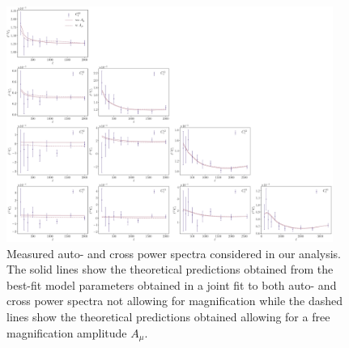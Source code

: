 \documentclass[a4paper,11pt]{article}
\begin{document}
\begin{figure}
\begin{center}
\includegraphics[width=0.95\textwidth]{figures/Cls-data-vs-best-fit_mPk=HOD_fix=alpha-fc-sigmaM_HOD=zevol_fit=pz-shifts+prior=0p2-pz-widths+prior=0p2_fit=auto+cross_cosmo=const_cov=G+NG+SSC-LINBIAS_HOD-param=zfid_clfit=HOD-zevol_no-mag-vs-mag.pdf}
\caption{Measured auto- and cross power spectra considered in our analysis. The solid lines show the theoretical predictions obtained from the best-fit model parameters obtained in a joint fit to both auto- and cross power spectra not allowing for magnification while the dashed lines show the theoretical predictions obtained allowing for a free magnification amplitude $A_{\mu}$.}
\label{fig:cls-best-fit}
\end{center}
\end{figure}
\end{document}
